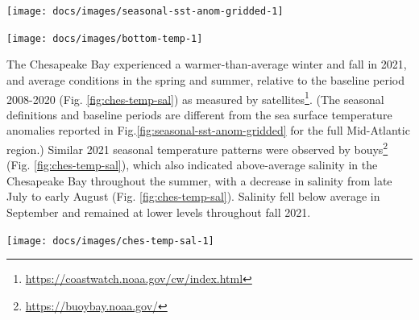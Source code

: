 \documentclass[
  10pt,
]{article}
\let\origfigure\figure
\let\endorigfigure\endfigure
\renewenvironment{figure}[1][2] {
    \expandafter\origfigure\expandafter[H]
} {
    \endorigfigure
}
\begin{document}
\begin{figure}

{\centering \texttt{[image: docs/images/seasonal-sst-anom-gridded-1]} 

}

\caption{MAB seasonal sea surface temperature (SST) time series overlaid onto 2021 seasonal spatial anomalies. Seasons are defined as: Jan-Mar for winter, Apr-Jun for spring, Jul-Sep for summer, and Oct-Dec for fall.}\label{fig:seasonal-sst-anom-gridded}
\end{figure}

\begin{figure}

{\centering \texttt{[image: docs/images/bottom-temp-1]} 

}

\caption{Annual bottom temperature in the Mid-Atlantic Bight. (black = in situ observations, red - observations from modeled reanalysis for comparison)}\label{fig:bottom-temp}
\end{figure}

The Chesapeake Bay experienced a warmer-than-average winter and fall in
2021, and average conditions in the spring and summer, relative to the
baseline period 2008-2020 (Fig. \ref{fig:ches-temp-sal}) as measured by
satellites\footnote{\url{https://coastwatch.noaa.gov/cw/index.html}}.
(The seasonal definitions and baseline periods are different from the
sea surface temperature anomalies reported in
Fig.\ref{fig:seasonal-sst-anom-gridded} for the full Mid-Atlantic
region.) Similar 2021 seasonal temperature patterns were observed by
bouys\footnote{\url{https://buoybay.noaa.gov/}} (Fig.
\ref{fig:ches-temp-sal}), which also indicated above-average salinity in
the Chesapeake Bay throughout the summer, with a decrease in salinity
from late July to early August (Fig. \ref{fig:ches-temp-sal}). Salinity
fell below average in September and remained at lower levels throughout
fall 2021.

\begin{figure}

{\centering \texttt{[image: docs/images/ches-temp-sal-1]} 

}

\caption{Left panel: 2021 sea surface temperature anomalies for the Chesapeake Bay.  Data are from NOAA’s multi-satellite SST products and produced by NOAA’s Coastwatch Program. Seasons are defined to match the annual life cycles of many biological resources in Chesapeake Bay: Dec-Feb for winter, Mar-May for spring, Jun-Aug for summer, and Sep-Nov for fall. Right panel: NOAA Chesapeake Bay Interpretive Buoy System Gooses Reef bouy sea water temperature (top) and salinity (bottom); Red = 2021, Blue = Long term average 2010-2020.}\label{fig:ches-temp-sal}
\end{figure}
\end{document}
